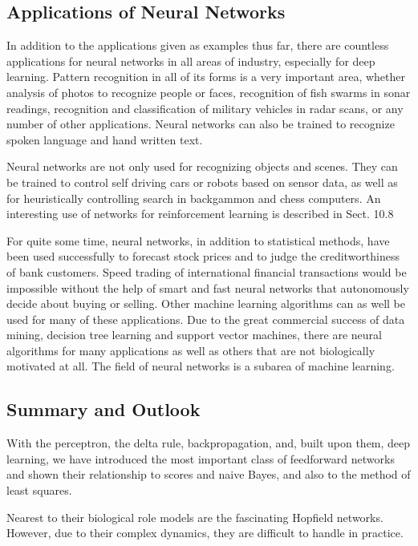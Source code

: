 \documentclass[10pt]{book}
\begin{document}
\subsection{Applications of Neural Networks}
In addition to the applications given as examples thus far, there are countless applications for neural networks in all areas of industry, especially for deep learning. Pattern recognition in all of its forms is a very important area, whether analysis of photos to recognize people or faces, recognition of fish swarms in sonar readings, recognition and classification of military vehicles in radar scans, or any number of other applications. Neural networks can also be trained to recognize spoken language and hand written text.

Neural networks are not only used for recognizing objects and scenes. They can be trained to control self driving cars or robots based on sensor data, as well as for heuristically controlling search in backgammon and chess computers. An interesting use of networks for reinforcement learning is described in Sect. 10.8

For quite some time, neural networks, in addition to statistical methods, have been used successfully to forecast stock prices and to judge the creditworthiness of bank customers. Speed trading of international financial transactions would be impossible without the help of smart and fast neural networks that autonomously decide about buying or selling.
Other machine learning algorithms can as well be used for many of these applications. Due to the great commercial success of data mining, decision tree learning and support vector machines, there are neural algorithms for many applications as well as others that are not biologically motivated at all. The field of neural networks is a subarea of machine learning.

\subsection{Summary and Outlook}
With the perceptron, the delta rule, backpropagation, and, built upon them, deep learning, we have introduced the most important class of feedforward networks and shown their relationship to scores and naive Bayes, and also to the method of least squares.

Nearest to their biological role models are the fascinating Hopfield networks. However, due to their complex dynamics, they are difficult to handle in practice.
\end{document}
